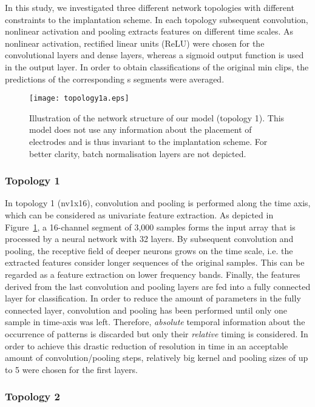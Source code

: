 \documentclass[a4paper, conference]{IEEEtran}
\begin{document}
In this study, we investigated three different network topologies with different constraints to the implantation scheme. In each topology subsequent convolution, nonlinear activation and pooling extracts features on different time scales. As nonlinear activation, rectified linear units (ReLU) were chosen for the convolutional layers and dense layers, whereas a sigmoid output function is used in the output layer. In order to obtain classifications of the original \unit[10]{min} clips, the predictions of the corresponding \unit[15]{s} segments were averaged.

\begin{figure}[t]
	\centering
	\texttt{[image: topology1a.eps]}
	\caption{Illustration of the network structure of our model (topology 1). This model does not use any information about the placement of electrodes and is thus invariant to the implantation scheme. For better clarity, batch normalisation layers are not depicted.}
	\label{fig:topology1a}
\end{figure}


\subsubsection*{Topology 1} 

In topology 1 (nv1x16), convolution and pooling is performed along the time axis, which can be considered as univariate feature extraction. As depicted in Figure~\ref{fig:topology1a}, a 16-channel  segment of 3,000 samples forms the input array that is processed by a neural network with 32 layers. By subsequent convolution and pooling, the receptive field of deeper neurons grows on the time scale, i.e. the extracted features consider longer sequences of the original samples. This can be regarded as a feature extraction on lower frequency bands. Finally, the features derived from the last convolution and pooling layers are fed into a fully connected layer for classification. In order to reduce the amount of parameters in the fully connected layer, convolution and pooling has been performed until only one sample in time-axis was left. Therefore, \textit{absolute} temporal information about the occurrence of patterns is discarded but only their \textit{relative} timing is considered. In order to achieve this drastic reduction of resolution in time in an acceptable amount of convolution/pooling steps, relatively big kernel and pooling sizes of up to 5 were chosen for the first layers.

\subsubsection*{Topology 2}
\end{document}

